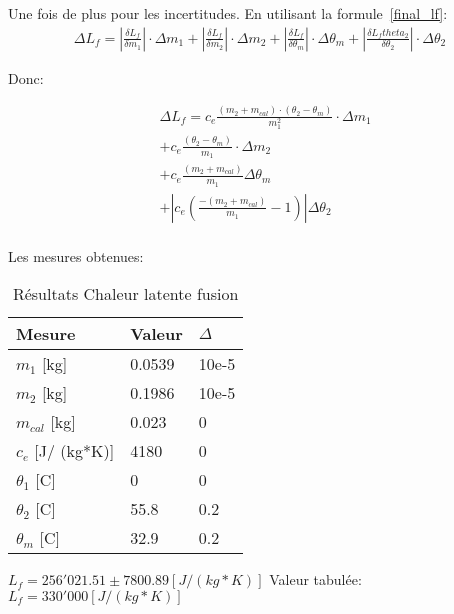 Une fois de plus pour les incertitudes.
En utilisant la formule~\eqref{final_lf}:
\begin{align*}
    \Delta L_f = |\frac{\delta L_f}{\delta m_1}|\cdot \Delta m_1 + |\frac{\delta L_f}{\delta m_2}|\cdot \Delta m_2 + |\frac{\delta L_f}{\delta \theta_m}|\cdot \Delta \theta_m + |\frac{\delta L_ftheta_2}{\delta \theta_2}|\cdot \Delta \theta_2
\end{align*}

Donc:

\begin{align*}
    &\Delta L_f = c_e \frac{(m_2 + m_{cal})\cdot (\theta_2 - \theta_m)}{m_1^2}\cdot \Delta m_1\\
    &+ c_e \frac{(\theta_2 - \theta_m)}{m_1}\cdot \Delta m_2\\
    &+ c_e \frac{(m_2 + m_{cal})}{m_1} \Delta \theta_m\\
    &+ |c_e (\frac{-(m_2 + m_{cal})}{m_1} -1)|\Delta \theta_2\\
\end{align*}

Les mesures obtenues:

\begin{table}[!h]
    \centering
    \caption{Résultats Chaleur latente fusion}
    \begin{tabular}{|l|l|l|}
	\hline
	Mesure	&Valeur	&$\Delta$\\
	\hline
	$m_1$ [kg]	&0.0539	&10e-5\\
	$m_2$ [kg]	&0.1986	&10e-5\\
	$m_{cal}$ [kg]	&0.023	&0\\
	$c_e$ [J/ (kg*K)]	&4180	&0\\
	$\theta_1$ [C\degree]	&0	&0\\
	$\theta_2$ [C\degree]	&55.8	&0.2\\
	$\theta_m$ [C\degree]	&32.9	&0.2\\
	\hline
    \end{tabular}
\end{table}

$L_f = 256'021.51 \pm 7800.89[J/ (kg*K)]$
Valeur tabulée: $L_f = 330'000[J/ (kg*K)]$

